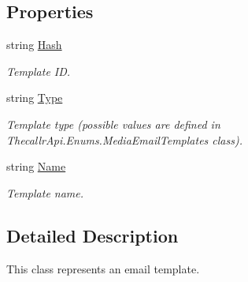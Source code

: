 \subsection*{Properties}
\begin{DoxyCompactItemize}
\item 
string \hyperlink{class_thecallr_api_1_1_objects_1_1_media_1_1_email_template_a502d2a4538c073aac28958d811fe3a0e}{Hash}
\begin{DoxyCompactList}\small\item\em Template I\+D. \end{DoxyCompactList}\item 
string \hyperlink{class_thecallr_api_1_1_objects_1_1_media_1_1_email_template_ae38f4e09ef638944137d7cf2082a4f0c}{Type}
\begin{DoxyCompactList}\small\item\em Template type (possible values are defined in Thecallr\+Api.\+Enums.\+Media\+Email\+Templates class). \end{DoxyCompactList}\item 
string \hyperlink{class_thecallr_api_1_1_objects_1_1_media_1_1_email_template_a1492e7daee29809843604fc8378a64e5}{Name}
\begin{DoxyCompactList}\small\item\em Template name. \end{DoxyCompactList}\end{DoxyCompactItemize}


\subsection{Detailed Description}
This class represents an email template. 



